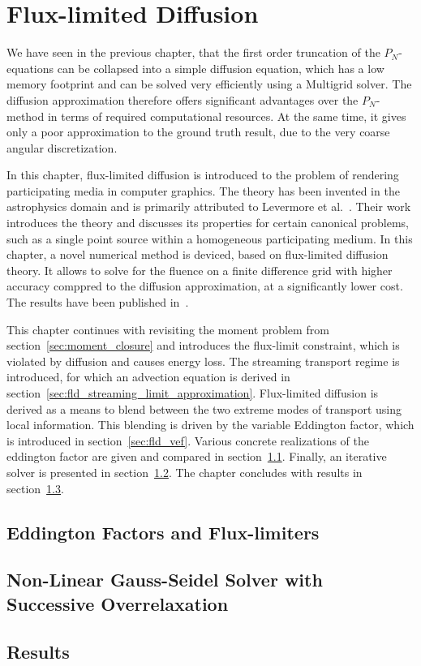 \chapter{Flux-limited Diffusion}
\label{sec:fld}

We have seen in the previous chapter, that the first order truncation of the $P_N$-equations can be collapsed into a simple diffusion equation, which has a low memory footprint and can be solved very efficiently using a Multigrid solver. The diffusion approximation therefore offers significant advantages over the $P_N$-method in terms of required computational resources. At the same time, it gives only a poor approximation to the ground truth result, due to the very coarse angular discretization.

In this chapter, flux-limited diffusion is introduced to the problem of rendering participating media in computer graphics. The theory has been invented in the astrophysics domain and is primarily attributed to Levermore et al.~\cite{Levermore81}. Their work introduces the theory and discusses its properties for certain canonical problems, such as a single point source within a homogeneous participating medium. In this chapter, a novel numerical method is deviced, based on flux-limited diffusion theory. It allows to solve for the fluence on a finite difference grid with higher accuracy comppred to the diffusion approximation, at a significantly lower cost. The results have been published in~\cite{Koerner14}.

This chapter continues with revisiting the moment problem from section~\ref{sec:moment_closure} and introduces the flux-limit constraint, which is violated by diffusion and causes energy loss. The streaming transport regime is introduced, for which an advection equation is derived in section~\ref{sec:fld_streaming_limit_approximation}. Flux-limited diffusion is derived as a means to blend between the two extreme modes of transport using local information. This blending is driven by the variable Eddington factor, which is introduced in section~\ref{sec:fld_vef}. Various concrete realizations of the eddington factor are given and compared in section~\ref{sec:fld_vef_factors}. Finally, an iterative solver is presented in section~\ref{sec:fld_solver}. The chapter concludes with results in section~\ref{sec:fld_results}.











\section{Eddington Factors and Flux-limiters}
\label{sec:fld_vef_factors}

\section{Non-Linear Gauss-Seidel Solver with Successive Overrelaxation}
\label{sec:fld_solver}

\section{Results}
\label{sec:fld_results}

